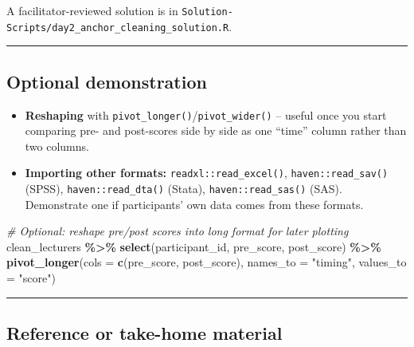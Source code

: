\documentclass[11pt]{article}
\newenvironment{Shaded}{\begin{snugshade}}{\end{snugshade}}
\newcommand{\AttributeTok}[1]{\textcolor[rgb]{0.13,0.29,0.53}{#1}}
\newcommand{\CommentTok}[1]{\textcolor[rgb]{0.56,0.35,0.01}{\textit{#1}}}
\newcommand{\FunctionTok}[1]{\textcolor[rgb]{0.13,0.29,0.53}{\textbf{#1}}}
\newcommand{\NormalTok}[1]{#1}
\newcommand{\SpecialCharTok}[1]{\textcolor[rgb]{0.81,0.36,0.00}{\textbf{#1}}}
\newcommand{\StringTok}[1]{\textcolor[rgb]{0.31,0.60,0.02}{#1}}
\providecommand{\tightlist}{%
  \setlength{\itemsep}{0pt}\setlength{\parskip}{0pt}}
\begin{document}
A facilitator-reviewed solution is in
\texttt{Solution-Scripts/day2\_anchor\_cleaning\_solution.R}.

\begin{center}\rule{0.5\linewidth}{0.5pt}\end{center}

\hypertarget{optional-demonstration}{%
\subsection{Optional demonstration}\label{optional-demonstration}}

\begin{itemize}
\tightlist
\item
  \textbf{Reshaping} with
  \texttt{pivot\_longer()}/\texttt{pivot\_wider()} -- useful once you
  start comparing pre- and post-scores side by side as one ``time''
  column rather than two columns.
\item
  \textbf{Importing other formats:} \texttt{readxl::read\_excel()},
  \texttt{haven::read\_sav()} (SPSS), \texttt{haven::read\_dta()}
  (Stata), \texttt{haven::read\_sas()} (SAS). Demonstrate one if
  participants' own data comes from these formats.
\end{itemize}

\begin{Shaded}
\begin{Highlighting}[]
\CommentTok{\# Optional: reshape pre/post scores into long format for later plotting}
\NormalTok{clean\_lecturers }\SpecialCharTok{\%\textgreater{}\%}
  \FunctionTok{select}\NormalTok{(participant\_id, pre\_score, post\_score) }\SpecialCharTok{\%\textgreater{}\%}
  \FunctionTok{pivot\_longer}\NormalTok{(}\AttributeTok{cols =} \FunctionTok{c}\NormalTok{(pre\_score, post\_score),}
               \AttributeTok{names\_to =} \StringTok{"timing"}\NormalTok{, }\AttributeTok{values\_to =} \StringTok{"score"}\NormalTok{)}
\end{Highlighting}
\end{Shaded}

\begin{center}\rule{0.5\linewidth}{0.5pt}\end{center}

\hypertarget{reference-or-take-home-material}{%
\subsection{Reference or take-home
material}\label{reference-or-take-home-material}}
\end{document}
